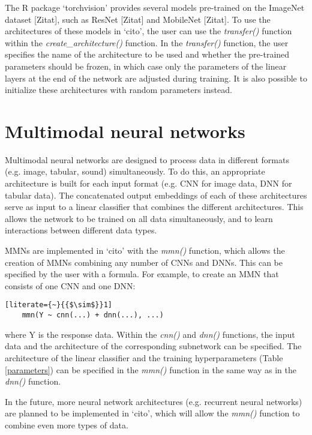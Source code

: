 \documentclass[12pt,twoside]{scrreport}
\newcommand{\pkg}[1]{`#1'}
\newcommand{\fn}[2][]{\textit{#2(}#1\textit{)}}
\begin{document}
The R package \pkg{torchvision} provides several models pre-trained on the ImageNet dataset [Zitat], such as ResNet [Zitat] and MobileNet [Zitat]. To use the architectures of these models in \pkg{cito}, the user can use the \fn{transfer} function within the \fn{create\_architecture} function. In the \fn{transfer} function, the user specifies the name of the architecture to be used and whether the pre-trained parameters should be frozen, in which case only the parameters of the linear layers at the end of the network are adjusted during training. It is also possible to initialize these architectures with random parameters instead.

\section*{Multimodal neural networks}
Multimodal neural networks are designed to process data in different formats (e.g. image, tabular, sound) simultaneously. To do this, an appropriate architecture is built for each input format (e.g. CNN for image data, DNN for tabular data). The concatenated output embeddings of each of these architectures serve as input to a linear classifier that combines the different architectures. This allows the network to be trained on all data simultaneously, and to learn interactions between different data types.

MMNs are implemented in \pkg{cito} with the \fn{mmn} function, which allows the creation of MMNs combining any number of CNNs and DNNs. This can be specified by the user with a formula. For example, to create an MMN that consists of one CNN and one DNN:

\begin{lstlisting}[literate={~}{{$\sim$}}1]
	mmn(Y ~ cnn(...) + dnn(...), ...)
\end{lstlisting}

where Y is the response data. Within the \fn{cnn} and \fn{dnn} functions, the input data and the architecture of the corresponding subnetwork can be specified. The architecture of the linear classifier and the training hyperparameters (Table \ref{parameters}) can be specified in the \fn{mmn} function in the same way as in the \fn{dnn} function.

In the future, more neural network architectures (e.g. recurrent neural networks) are planned to be implemented in \pkg{cito}, which will allow the \fn{mmn} function to combine even more types of data. 
\end{document}
